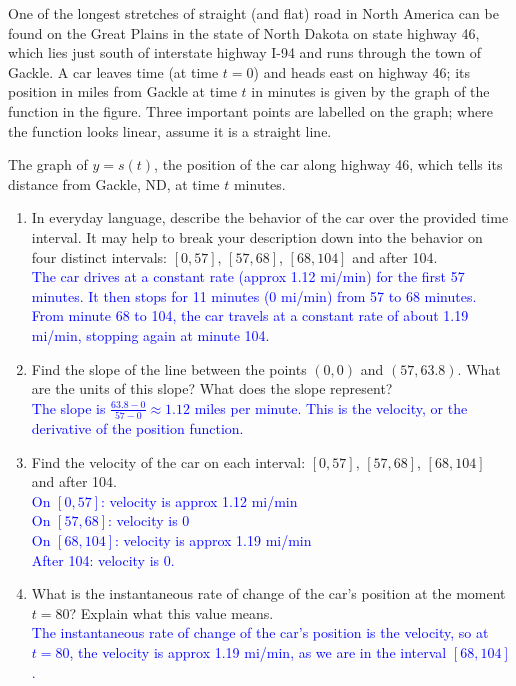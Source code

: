 \documentclass{ximera}
\begin{document}
\begin{exercise}
    One of the longest stretches of straight (and flat) road in North America can be found on the Great Plains in the state of North Dakota on state highway 46, which lies just south of interstate highway I-94 and runs through the town of Gackle.  A car leaves time (at time $t=0$) and heads east on highway 46; its position in miles from Gackle at time $t$ in minutes is given by the graph of the function in the figure.  Three important points are labelled on the graph; where the function looks linear, assume it is a straight line.
    \begin{center}
    \end{center}
    The graph of $y=s(t)$, the position of the car along highway 46, which tells its distance from Gackle, ND, at time $t$ minutes.
    \begin{enumerate}
        \item In everyday language, describe the behavior of the car over the provided time interval. It may help to break your description down into the behavior on four distinct intervals: $[0,57]$, $[57,68]$, $[68,104]$ and after 104.\\
        \textcolor{blue}{The car drives at a constant rate (approx 1.12 mi/min) for the first 57 minutes.  It then stops for 11 minutes (0 mi/min) from 57 to 68 minutes.  From minute 68 to 104, the car travels at a constant rate of about 1.19 mi/min, stopping again at minute 104.}
        \item Find the slope of the line between the points $(0,0)$ and $(57, 63.8)$.  What are the units of this slope?  What does the slope represent?\\
        \textcolor{blue}{The slope is $\frac{63.8-0}{57-0}\approx 1.12$ miles per minute.  This is the velocity, or the derivative of the position function.}
        \item Find the velocity of the car on each interval: $[0,57]$, $[57,68]$, $[68,104]$ and after 104.\\
        \textcolor{blue}{On $[0,57]$: velocity is approx 1.12 mi/min\\
        On $[57,68]$: velocity is 0\\
        On $[68, 104]$: velocity is approx 1.19 mi/min\\
        After 104: velocity is 0.}
        \item What is the instantaneous rate of change of the car's position at the moment $t=80$?  Explain what this value means.\\
        \textcolor{blue}{The instantaneous rate of change of the car's position is the velocity, so at $t=80$, the velocity is approx 1.19 mi/min, as we are in the interval $[68, 104]$.}
    \end{enumerate}
\end{exercise}
\end{document}
